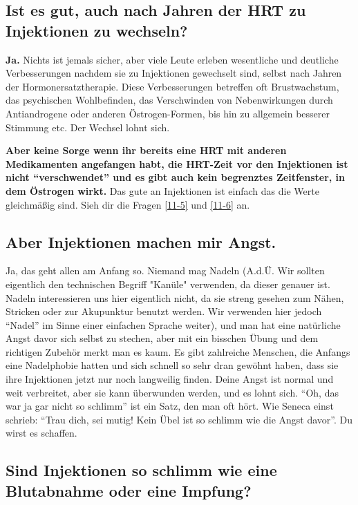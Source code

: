 \documentclass{article}
\begin{document}
\subsection{Ist es gut, auch nach Jahren der HRT zu Injektionen zu wechseln?}

\textbf{Ja.} Nichts ist jemals sicher, aber viele Leute erleben wesentliche und deutliche Verbesserungen nachdem sie zu Injektionen gewechselt sind, selbst nach Jahren der Hormonersatztherapie. Diese Verbesserungen betreffen oft Brustwachstum, das psychischen Wohlbefinden, das Verschwinden von Nebenwirkungen durch Antiandrogene oder anderen Östrogen-Formen, bis hin zu allgemein besserer Stimmung etc. Der Wechsel lohnt sich.

\textbf{Aber keine Sorge wenn ihr bereits eine HRT mit anderen Medikamenten angefangen habt, die HRT-Zeit vor den Injektionen ist nicht “verschwendet” und es gibt auch kein begrenztes Zeitfenster, in dem Östrogen wirkt.} Das gute an Injektionen ist einfach das die Werte gleichmäßig sind. Sieh dir die Fragen \ref{11-5} und \ref{11-6} an.

\subsection{Aber Injektionen machen mir Angst.}
Ja, das geht allen am Anfang so. Niemand mag Nadeln  (A.d.Ü. Wir sollten eigentlich den technischen Begriff "Kanüle" verwenden, da dieser genauer ist. Nadeln interessieren uns hier eigentlich nicht, da sie streng gesehen zum Nähen, Stricken oder zur Akupunktur benutzt werden. Wir verwenden hier jedoch “Nadel” im Sinne einer einfachen Sprache weiter), und man hat eine natürliche Angst davor sich selbst zu stechen, aber mit ein bisschen Übung und dem richtigen Zubehör merkt man es kaum. Es gibt zahlreiche Menschen, die Anfangs eine Nadelphobie hatten und sich schnell so sehr dran gewöhnt haben, dass sie ihre Injektionen jetzt nur noch langweilig finden. Deine Angst ist normal und weit verbreitet, aber sie kann überwunden werden, und es lohnt sich. “Oh, das war ja gar nicht so schlimm” ist ein Satz, den man oft hört. Wie Seneca einst schrieb: “Trau dich, sei mutig! Kein Übel ist so schlimm wie die Angst davor”. Du wirst es schaffen.

\subsection{Sind Injektionen so schlimm wie eine Blutabnahme oder eine Impfung?}
\end{document}
